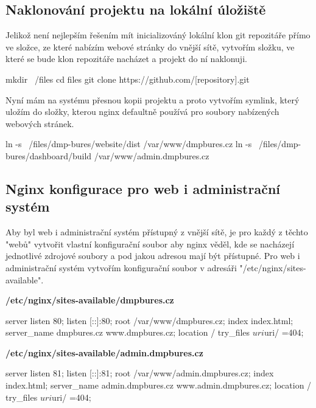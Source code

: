 \documentclass[12pt,a4paper]{report}
\begin{document}
  \subsection{Naklonování projektu na lokální úložiště}
  Jelikož není nejlepším řešením mít inicializováný lokální klon git repozitáře přímo ve složce, ze které 
  nabízím webové stránky do vnější sítě, vytvořím složku, ve které se bude klon repozitáře nacházet a projekt do ní naklonuji.
  \begin{bash}
    mkdir ~/files
    cd files
    git clone https://github.com/[repository].git 
  \end{bash}
  
  Nyní mám na systému přesnou kopii projektu a proto vytvořím symlink, který uložím do složky,
  kterou nginx defaultně používá pro soubory nabízených webových stránek.

  \begin{bash}
    ln -s ~/files/dmp-bures/website/dist /var/www/dmpbures.cz
    ln -s ~/files/dmp-bures/dashboard/build /var/www/admin.dmpbures.cz
  \end{bash}

  \subsection{Nginx konfigurace pro web i administrační systém}
  Aby byl web i administrační systém přístupný z vnější sítě, je pro každý z těchto "webů"  vytvořit 
  vlastní konfigurační soubor aby nginx věděl, kde se nacházejí jednotlivé zdrojové soubory a 
  pod jakou adresou mají být přístupné.
  Pro web i administrační systém vytvořím konfigurační soubor v adresáři "/etc/nginx/sites-available".
  
  \noindent\textbf{/etc/nginx/sites-available/dmpbures.cz}
  \begin{bash}
  server {
    listen 80;
    listen [::]:80;
    root /var/www/dmpbures.cz;
    index index.html;
    server_name dmpbures.cz www.dmpbures.cz;
    location / {
      try_files $uri $uri/ =404;
    }
  }
  \end{bash}

  \noindent\textbf{/etc/nginx/sites-available/admin.dmpbures.cz}
  \begin{bash}
  server {
    listen 81;
    listen [::]:81;
    root /var/www/admin.dmpbures.cz;
    index index.html;
    server_name admin.dmpbures.cz www.admin.dmpbures.cz;
    location / {
      try_files $uri $uri/ =404;
    }
  }
  \end{bash}
  
\end{document}
